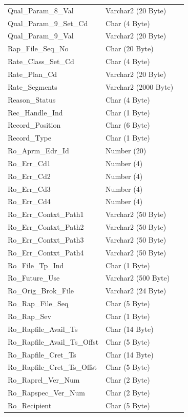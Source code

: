 \documentclass[12pt,twoside]{article}
\begin{document}
\begin{longtable}{l|l|l}
Qual\_Param\_8\_Val & Varchar2 (20 Byte) & \\
Qual\_Param\_9\_Set\_Cd & Char (4 Byte) & \\
Qual\_Param\_9\_Val & Varchar2 (20 Byte) & \\
Rap\_File\_Seq\_No & Char (20 Byte) & \\
Rate\_Class\_Set\_Cd & Char (4 Byte) & \\
Rate\_Plan\_Cd & Varchar2 (20 Byte) & \\
Rate\_Segments & Varchar2 (2000 Byte) & \\
Reason\_Status & Char (4 Byte) & \\
Rec\_Handle\_Ind & Char (1 Byte) & \\
Record\_Position & Char (6 Byte) & \\
Record\_Type & Char (1 Byte) & \\
Ro\_Aprm\_Edr\_Id & Number (20) & \\
Ro\_Err\_Cd1 & Number (4) & \\
Ro\_Err\_Cd2 & Number (4) & \\
Ro\_Err\_Cd3 & Number (4) & \\
Ro\_Err\_Cd4 & Number (4) & \\
Ro\_Err\_Contxt\_Path1 & Varchar2 (50 Byte) & \\
Ro\_Err\_Contxt\_Path2 & Varchar2 (50 Byte) & \\
Ro\_Err\_Contxt\_Path3 & Varchar2 (50 Byte) & \\
Ro\_Err\_Contxt\_Path4 & Varchar2 (50 Byte) & \\
Ro\_File\_Tp\_Ind & Char (1 Byte) & \\
Ro\_Future\_Use & Varchar2 (500 Byte) & \\
Ro\_Orig\_Brok\_File & Varchar2 (24 Byte) & \\
Ro\_Rap\_File\_Seq & Char (5 Byte) & \\
Ro\_Rap\_Sev & Char (1 Byte) & \\
Ro\_Rapfile\_Avail\_Ts & Char (14 Byte) & \\
Ro\_Rapfile\_Avail\_Ts\_Offst & Char (5 Byte) & \\
Ro\_Rapfile\_Cret\_Ts & Char (14 Byte) & \\
Ro\_Rapfile\_Cret\_Ts\_Offst & Char (5 Byte) & \\
Ro\_Raprel\_Ver\_Num & Char (2 Byte) & \\
Ro\_Rapspec\_Ver\_Num & Char (2 Byte) & \\
Ro\_Recipient & Char (5 Byte) & \\

\end{longtable}
\end{document}
